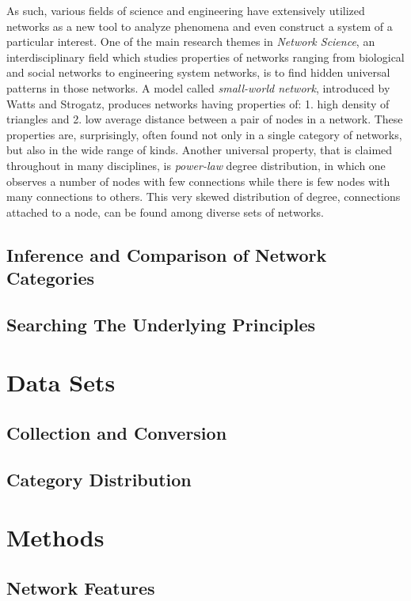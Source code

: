 \documentclass{article}
\begin{document}
	As such, various fields of science and engineering have extensively utilized networks as a new tool to analyze phenomena and even construct a system of a particular interest. One of the main research themes in \textit{Network Science}, an interdisciplinary field which studies properties of networks ranging from biological and social networks to engineering system networks, is to find hidden universal patterns in those networks. A model called \textit{small-world network}, introduced by Watts and Strogatz, produces networks having properties of: 1. high density of triangles and 2. low average distance between a pair of nodes in a network. These properties are, surprisingly, often found not only in a single category of networks, but also in the wide range of kinds. Another universal property, that is claimed throughout in many disciplines, is \textit{power-law} degree distribution, in which one observes a number of nodes with few connections while there is few nodes with many connections to others. This very skewed distribution of degree, connections attached to a node, can be found among diverse sets of networks.
	
	\subsection{Inference and Comparison of Network Categories}
	\subsection{Searching The Underlying Principles}


\section{Data Sets}
	\subsection{Collection and Conversion}
	\subsection{Category Distribution}

\section{Methods}
	\subsection{Network Features}
\end{document}
